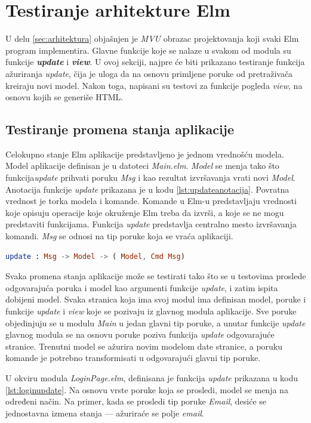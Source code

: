 \documentclass[12pt,oneside]{memoir}
\begin{document}
\section{Testiranje arhitekture Elm}
\par U delu \ref{sec:arhitektura} objašnjen je \emph{MVU} obrazac projektovanja koji svaki Elm program implementira. Glavne funkcije koje se nalaze u svakom od modula su funkcije \textbf{\emph{update}} i \emph{\textbf{view}}. U ovoj sekciji, najpre će biti prikazano testiranje funkcija ažuriranja \emph{update}, čija je uloga da na osnovu primljene poruke od pretraživača kreiraju novi model. Nakon toga, napisani su testovi za funkcije pogleda \emph{view}, na osnovu kojih se generiše HTML.

\subsection{Testiranje promena stanja aplikacije}

\par Celokupno stanje Elm aplikacije predstavljeno je jednom vrednošću modela. Model aplikacije definisan je u datoteci \emph{Main.elm}. \emph{Model} se menja tako što funkcija\emph{update} prihvati poruku \emph{Msg} i kao rezultat izvršavanja vrati novi \emph{Model}. Anotacija funkcije \emph{update} prikazana je u kodu \ref{lst:updateanotacija}. Povratna vrednost je torka modela i komande.  Komande u Elm-u predstavljaju vrednosti koje opisuju operacije koje okruženje Elm treba da izvrši, a koje se ne mogu predstaviti funkcijama. Funkcija \emph{update} predstavlja centralno mesto izvršavanja komandi. \emph{Msg} se odnosi na tip poruke koja se vraća aplikaciji. 

\begin{lstlisting}[language=elm, caption={Anotacija funkcije \emph{update}},captionpos=b, label={lst:updateanotacija}]
update : Msg -> Model -> ( Model, Cmd Msg)
\end{lstlisting}

\par Svaka promena stanja aplikacije može se testirati tako što se u testovima proslede odgovarajuća poruka i model kao argumenti funkcije \emph{update}, i zatim ispita dobijeni model. Svaka stranica koja ima svoj modul ima definisan model, poruke i funkcije \emph{update} i \emph{view} koje se pozivaju iz glavnog modula aplikacije. Sve poruke objedinjuju se u modulu \emph{Main} u jedan glavni tip poruke, a unutar funkcije \emph{update} glavnog modula se na osnovu poruke poziva funkcija \emph{update} odgovarajuće stranice. Trenutni model se ažurira novim modelom date stranice, a poruku komande je potrebno transformisati u odgovarajući glavni tip poruke.
\par U okviru modula \emph{LoginPage.elm}, definisana je funkcija \emph{update} prikazana u kodu \ref{lst:loginupdate}. Na osnovu vrste poruke koja se prosledi, model se menja na određeni način. Na primer, kada se prosledi tip poruke \emph{Email}, desiće se jednostavna izmena stanja --- ažuriraće se polje \emph{email}.
\end{document}
